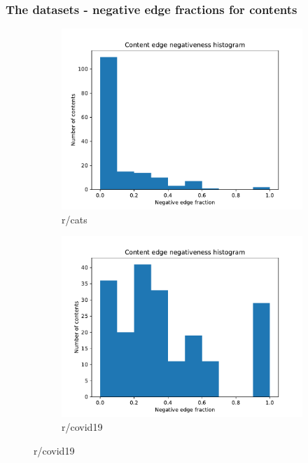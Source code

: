 \documentclass{beamer}
\begin{document}
\begin{frame}[c]
	\frametitle{The datasets - negative edge fractions for contents}
	\begin{figure}
		\begin{center}
			\begin{subfigure}[b]{0.4\textwidth}
				\centering
				\includegraphics[width=\textwidth]{out/cats200/neg-fraction-content-hist.pdf}
				\caption{r/cats}
				\label{fig:out/bbcscience200/neg-fraction-content-hist.pdf}
			\end{subfigure}
			\begin{subfigure}[b]{0.4\textwidth}
				\centering
				\includegraphics[width=\textwidth]{out/covid19200/neg-fraction-content-hist.pdf}
				\caption{r/covid19}

\end{subfigure}
\end{center}
\end{figure}
\end{frame}
\end{document}
